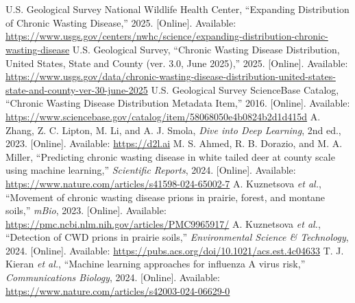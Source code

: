 \documentclass[conference]{IEEEtran}
\begin{document}
\section{}
\begin{thebibliography}{00}
 U.S. Geological Survey National Wildlife Health Center, ``Expanding Distribution of Chronic Wasting Disease,'' 2025. [Online]. Available: \url{https://www.usgs.gov/centers/nwhc/science/expanding-distribution-chronic-wasting-disease}
 U.S. Geological Survey, ``Chronic Wasting Disease Distribution, United States, State and County (ver. 3.0, June 2025),'' 2025. [Online]. Available: \url{https://www.usgs.gov/data/chronic-wasting-disease-distribution-united-states-state-and-county-ver-30-june-2025}
 U.S. Geological Survey ScienceBase Catalog, ``Chronic Wasting Disease Distribution Metadata Item,'' 2016. [Online]. Available: \url{https://www.sciencebase.gov/catalog/item/58068050e4b0824b2d1d415d}
 A. Zhang, Z. C. Lipton, M. Li, and A. J. Smola, \textit{Dive into Deep Learning}, 2nd ed., 2023. [Online]. Available: \url{https://d2l.ai}
 M. S. Ahmed, R. B. Dorazio, and M. A. Miller, ``Predicting chronic wasting disease in white tailed deer at county scale using machine learning,'' \textit{Scientific Reports}, 2024. [Online]. Available: \url{https://www.nature.com/articles/s41598-024-65002-7}
 A. Kuznetsova \textit{et al.}, ``Movement of chronic wasting disease prions in prairie, forest, and montane soils,'' \textit{mBio}, 2023. [Online]. Available: \url{https://pmc.ncbi.nlm.nih.gov/articles/PMC9965917/}
 A. Kuznetsova \textit{et al.}, ``Detection of CWD prions in prairie soils,'' \textit{Environmental Science \& Technology}, 2024. [Online]. Available: \url{https://pubs.acs.org/doi/10.1021/acs.est.4c04633}
 T. J. Kieran \textit{et al.}, ``Machine learning approaches for influenza A virus risk,'' \textit{Communications Biology}, 2024. [Online]. Available: \url{https://www.nature.com/articles/s42003-024-06629-0}
\end{thebibliography}
\end{document}
